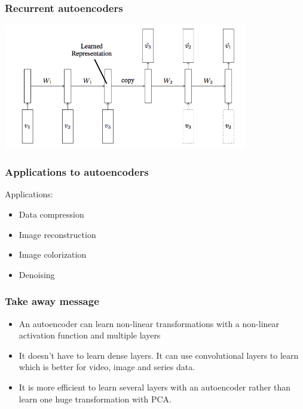 \documentclass[11pt,a4paper]{beamer}
\begin{document}
\begin{frame}
	\frametitle{Recurrent autoencoders}
	\centering
	\includegraphics[width=0.8\textwidth]{figures/LSTM_AE.png}
\end{frame}



\begin{frame}
	\frametitle{Applications to autoencoders}

	Applications:
	\begin{itemize}
		\item Data compression
		\item Image reconstruction
		\item Image colorization
		\item Denoising
	\end{itemize}

\end{frame}




\begin{frame}
	\frametitle{Take away message}

	\begin{itemize}
		\item An autoencoder can learn non-linear transformations with a non-linear activation function and multiple layers
		\item It doesn’t have to learn dense layers. It can use convolutional layers to learn which is better for video, image and series data.
		\item It is more efficient to learn several layers with an autoencoder rather than learn one huge transformation with PCA.
	\end{itemize}

\end{frame}
\end{document}
